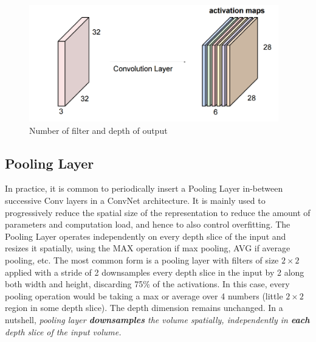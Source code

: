 \documentclass[twoside]{article}
\begin{document}
\begin{figure}[!htb]
\centering
\includegraphics[height = 2in]{pics/cnn2.png}
\caption{Number of filter and depth of output\cite{cs231n-website}}
\label{fig:conv_demo2}
\end{figure}
\subsection{Pooling Layer}
In practice, it is common to periodically insert a Pooling Layer in-between successive Conv layers in a ConvNet architecture. It is mainly used to progressively reduce the spatial size of the representation to reduce the amount of parameters and computation load, and hence to also control overfitting. The Pooling Layer operates independently on every depth slice of the input and resizes it spatially, using the MAX operation if max pooling, AVG if average pooling, etc. The most common form is a pooling layer with filters of size $2\times2$ applied with a stride of 2 downsamples every depth slice in the input by 2 along both width and height, discarding 75\% of the activations. In this case, every pooling operation would be taking a max or average over 4 numbers (little $2\times2$ region in some depth slice). The depth dimension remains unchanged. In a nutshell, \textit{pooling layer \textbf{downsamples} the volume spatially, independently in \textbf{each} depth slice of the input volume.} 
\end{document}
